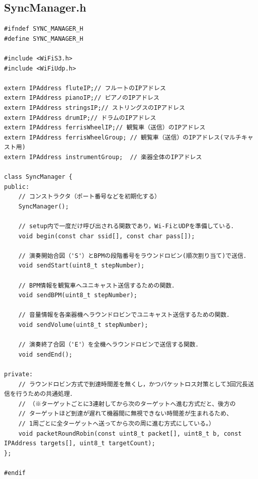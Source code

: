 \subsection{SyncManager.h}
\begin{lstlisting}[caption={SyncManager.h}, label={lst:siki_sync_h}]
#ifndef SYNC_MANAGER_H
#define SYNC_MANAGER_H

#include <WiFiS3.h>
#include <WiFiUdp.h>

extern IPAddress fluteIP;// フルートのIPアドレス
extern IPAddress pianoIP;// ピアノのIPアドレス
extern IPAddress stringsIP;// ストリングスのIPアドレス
extern IPAddress drumIP;// ドラムのIPアドレス
extern IPAddress ferrisWheelIP;// 観覧車（送信）のIPアドレス
extern IPAddress ferrisWheelGroup; // 観覧車（送信）のIPアドレス(マルチキャスト用)
extern IPAddress instrumentGroup;  // 楽器全体のIPアドレス

class SyncManager {
public:
    // コンストラクタ（ポート番号などを初期化する）
    SyncManager();
    
    // setup内で一度だけ呼び出される関数であり，Wi-FiとUDPを準備している．
    void begin(const char ssid[], const char pass[]);
    
    // 演奏開始合図（'S'）とBPMの段階番号をラウンドロビン(順次割り当て)で送信．
    void sendStart(uint8_t stepNumber);
    
    // BPM情報を観覧車へユニキャスト送信するための関数．
    void sendBPM(uint8_t stepNumber);
    
    // 音量情報を各楽器機へラウンドロビンでユニキャスト送信するための関数．
    void sendVolume(uint8_t stepNumber);
    
    // 演奏終了合図（'E'）を全機へラウンドロビンで送信する関数．
    void sendEnd();

private:
    // ラウンドロビン方式で到達時間差を無くし，かつパケットロス対策として3回冗長送信を行うための共通処理．
    // （※ターゲットごとに3連射してから次のターゲットへ進む方式だと、後方の
    // ターゲットほど到達が遅れて機器間に無視できない時間差が生まれるため、
    // 1周ごとに全ターゲットへ送ってから次の周に進む方式にしている。）
    void packetRoundRobin(const uint8_t packet[], uint8_t b, const IPAddress targets[], uint8_t targetCount);
};

#endif
\end{lstlisting}

